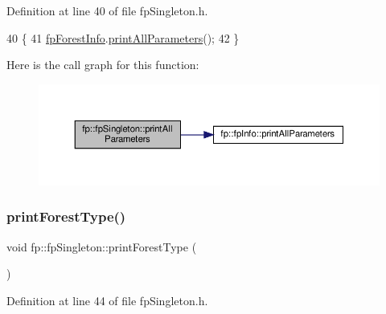 Definition at line 40 of file fp\+Singleton.\+h.


\begin{DoxyCode}
40                                             \{
41                 \hyperlink{classfp_1_1fpSingleton_a85965009befa72a749ae498fa5b6ccfa}{fpForestInfo}.\hyperlink{classfp_1_1fpInfo_a471bd46c828547d5b556f6f4e9fca70f}{printAllParameters}();
42             \}
\end{DoxyCode}
Here is the call graph for this function\+:\nopagebreak
\begin{figure}[H]
\begin{center}
\leavevmode
\includegraphics[width=350pt]{classfp_1_1fpSingleton_a0d769b6652e4c74c2734cdc811eeab5a_cgraph}
\end{center}
\end{figure}
\mbox{\label{classfp_1_1fpSingleton_ad9696336521f72c7c6a021608799871e}} 
\subsubsection{\texorpdfstring{print\+Forest\+Type()}{printForestType()}}
{\footnotesize\ttfamily void fp\+::fp\+Singleton\+::print\+Forest\+Type (\begin{DoxyParamCaption}{ }\end{DoxyParamCaption})\hspace{0.3cm}{\ttfamily [inline]}}



Definition at line 44 of file fp\+Singleton.\+h.


